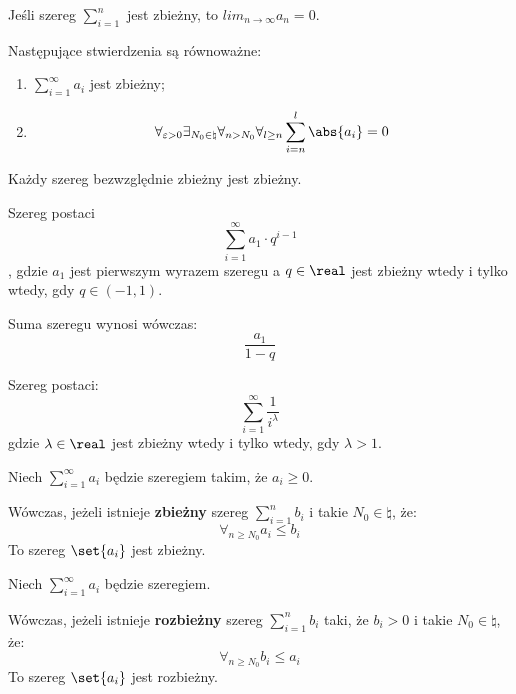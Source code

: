 \begin{fact}
    Jeśli szereg \( \sum_{i=1}^{n} \) jest zbieżny, to \( lim_{n \rightarrow \infty} a_n = 0 \). 
\end{fact}
\begin{fact}
    Następujące stwierdzenia są równoważne:
    \begin{enumerate}
        \item \( \sum_{i=1}^{\infty} a_i \) jest zbieżny;  
        \item \[
            \forall_{\varepsilon > 0} \exists_{N_0 \in \natural } \forall_{n > N_0} \forall_{l \geq n} \sum_{i=n}^{l} \abs{a_i} = 0
        \] 
    \end{enumerate}
\end{fact}
\begin{fact}
    Każdy szereg bezwzględnie zbieżny jest zbieżny. 
\end{fact}
\begin{fact}
    Szereg postaci 
    \[
        \sum_{i=1}^{\infty} a_1 \cdot q^{i-1}
    \],
    gdzie \(a_1\) jest pierwszym wyrazem szeregu a \(q \in \real \) jest zbieżny wtedy i tylko wtedy, gdy \(q \in (-1, 1)\).

    Suma szeregu wynosi wówczas: 
    \[
        \frac{a_1}{1-q}
    \]
\end{fact}
\begin{fact}
    Szereg postaci: 
    \[
        \sum_{i=1}^{\infty} \frac{1}{i^{\lambda}}
    \]
    gdzie \(\lambda \in \real\) jest zbieżny wtedy i tylko wtedy, gdy \(\lambda > 1\).
\end{fact}
\begin{fact}
    Niech \( \sum_{i=1}^{\infty} a_i \) będzie szeregiem takim, że \(a_i \geq 0\). 
    
    Wówczas, jeżeli istnieje \textbf{zbieżny} szereg \( \sum_{i=1}^{n} b_i \) i takie \(N_0 \in \natural\), że: 
    \[
        \forall_{n \geq N_0} a_i \leq b_i
    \]
    To szereg \(\set{a_i}\) jest zbieżny. 
\end{fact}
\begin{fact}
    Niech \( \sum_{i=1}^{\infty} a_i \) będzie szeregiem. 
    
    Wówczas, jeżeli istnieje \textbf{rozbieżny} szereg \( \sum_{i=1}^{n} b_i \) taki, że \(b_i > 0\) i takie \(N_0 \in \natural\), że: 
    \[
        \forall_{n \geq N_0} b_i \leq a_i
    \]
    To szereg \(\set{a_i}\) jest rozbieżny. 
\end{fact}
